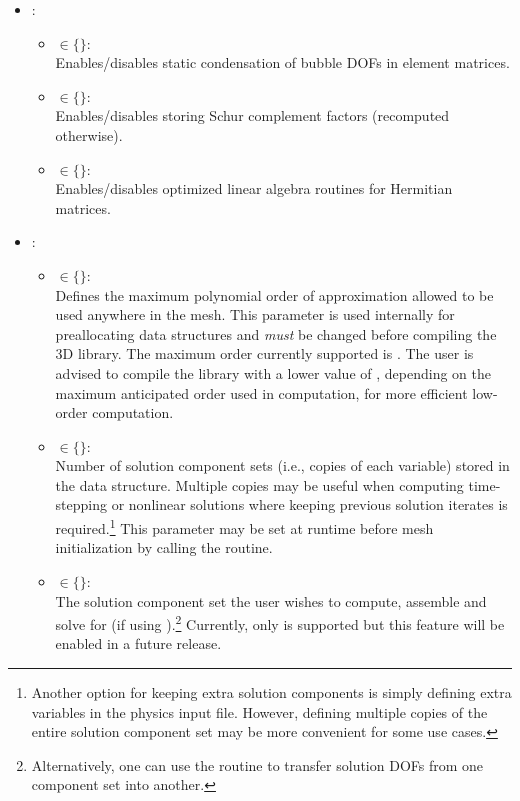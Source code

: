 \begin{itemize}
	\item
	{
		 :
		\begin{itemize}
			\item { $\in \{$$\}$: \\
				Enables/disables static condensation of bubble DOFs in element matrices.}
			\item { $\in \{$$\}$: \\
				Enables/disables storing Schur complement factors (recomputed otherwise).}
			\item { $\in \{$$\}$: \\
				Enables/disables optimized linear algebra routines for Hermitian matrices.}
		\end{itemize}
	}
	\item
	{
		 : 
		\begin{itemize}
			\item { $\in \{$$\}$:\\
			Defines the maximum polynomial order of approximation allowed to be used anywhere in the mesh. This parameter is used internally for preallocating data structures and \emph{must} be changed before compiling the \hp3D library. The maximum order currently supported is . The user is advised to compile the library with a lower value of , depending on the maximum anticipated order used in computation, for more efficient low-order computation.
			}
			\item { $\in \{$$\}$:\\
			Number of solution component sets (i.e., copies of each variable) stored in the data structure. Multiple copies may be useful when computing time-stepping or nonlinear solutions where keeping previous solution iterates is required.\footnote{Another option for keeping extra solution components is simply defining extra variables in the physics input file. However, defining multiple copies of the entire solution component set may be more convenient for some use cases.} This parameter may be set at runtime before mesh initialization by calling the  routine.
			}
			\item {} $\in \{$$\}$:\\
			The solution component set the user wishes to compute, assemble and solve for (if using ).\footnote{Alternatively, one can use the  routine to transfer solution DOFs from one component set into another.} Currently, only  is supported but this feature will be enabled in a future release.

\end{itemize}}
\end{itemize}
